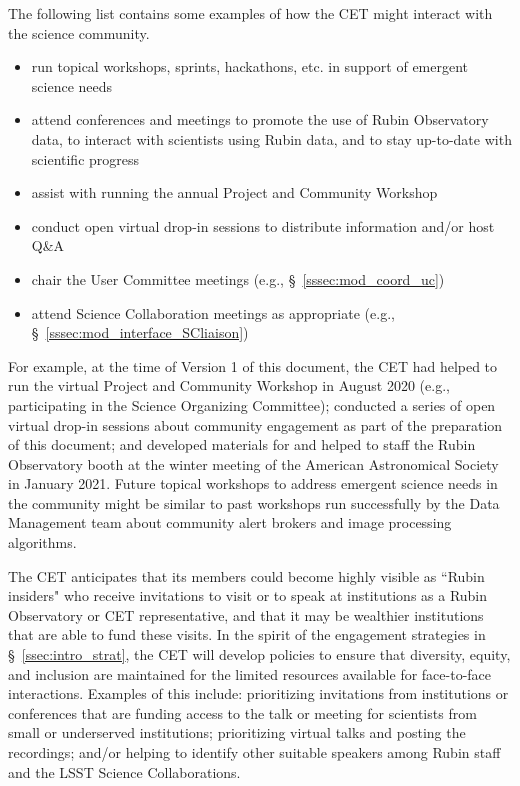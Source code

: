 \documentclass[DM,lsstdraft,toc]{lsstdoc}
\begin{document}
The following list contains some examples of how the CET might interact with the science community.
\begin{itemize}
\item run topical workshops, sprints, hackathons, etc. in support of emergent science needs
\item attend conferences and meetings to promote the use of Rubin Observatory data, to interact with scientists using Rubin data, and to stay up-to-date with scientific progress
\item assist with running the annual Project and Community Workshop
\item conduct open virtual drop-in sessions to distribute information and/or host Q\&A 
\item chair the User Committee meetings (e.g., \S~\ref{sssec:mod_coord_uc})
\item attend Science Collaboration meetings as appropriate (e.g., \S~\ref{sssec:mod_interface_SCliaison})
\end{itemize}

For example, at the time of Version 1 of this document, the CET had helped to run the virtual Project and Community Workshop in August 2020 (e.g., participating in the Science Organizing Committee); conducted a series of open virtual drop-in sessions about community engagement as part of the preparation of this document; and developed materials for and helped to staff the Rubin Observatory booth at the winter meeting of the American Astronomical Society in January 2021. 
Future topical workshops to address emergent science needs in the community might be similar to past workshops run successfully by the Data Management team about community alert brokers and image processing algorithms. 

The CET anticipates that its members could become highly visible as ``Rubin insiders" who receive invitations to visit or to speak at institutions as a Rubin Observatory or CET representative, and that it may be wealthier institutions that are able to fund these visits.
In the spirit of the engagement strategies in \S~\ref{ssec:intro_strat}, the CET will develop policies to ensure that diversity, equity, and inclusion are maintained for the limited resources available for face-to-face interactions. 
Examples of this include: prioritizing invitations from institutions or conferences that are funding access to the talk or meeting for scientists from small or underserved institutions; prioritizing virtual talks and posting the recordings; and/or helping to identify other suitable speakers among Rubin staff and the LSST Science Collaborations.
\end{document}
